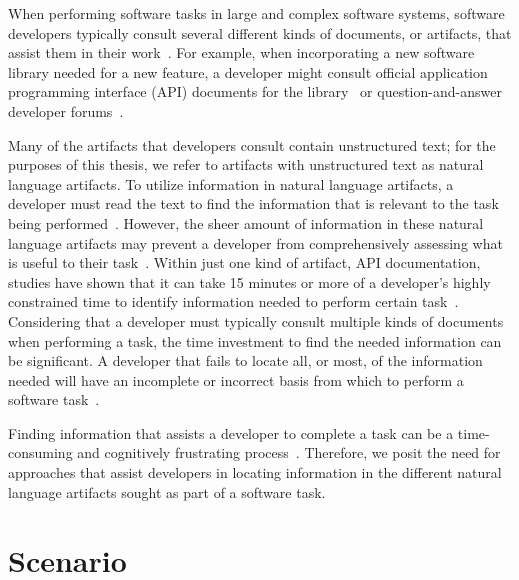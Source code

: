 

When performing software tasks in large and complex software systems, software developers typically consult several different kinds of documents, or artifacts, that assist them in their work~\cite{Starke2009, Meyer2017}. For example, 
when incorporating a new software library needed for a new feature, a developer might consult official application programming interface (API) documents for the library~\cite{robillard2011field, umarji2008archetypal} or 
 question-and-answer developer forums~\cite{parnin2012, silva2019}.



Many of the artifacts that developers consult
contain unstructured text; for the purposes of this thesis, we refer to artifacts with unstructured text as natural language artifacts.  
To utilize information in  natural language artifacts, a developer must read the text to find the information that is relevant to the task being performed~\cite{Bavota2016}.
However, 
the sheer amount of information in these natural language artifacts may prevent a developer from comprehensively assessing what is useful to their task~\cite{Murphy2005}.
Within just one kind of artifact, API
documentation, studies have shown that it can take 15 minutes or more
of a developer's highly constrained time to identify 
information needed to perform certain task~\cite{endrikat2014, Meyer2017}. 
Considering that a developer must typically
consult multiple kinds of documents
when performing a task, the time investment to find the needed information can be significant.
A developer that fails to locate all, or most, of the information needed
will have an incomplete or incorrect basis from which to perform a software task~\cite{Murphy2005}. 



Finding information that assists a developer to complete a task can be a time-consuming
 and cognitively frustrating process~\cite{Begel2008,
 robillard2011field}. Therefore, we posit the need for approaches that assist developers in locating information in the different natural language artifacts sought  as part of a software task.

 
 



 \section{Scenario}
 \label{cp1:example}
 
 
 
